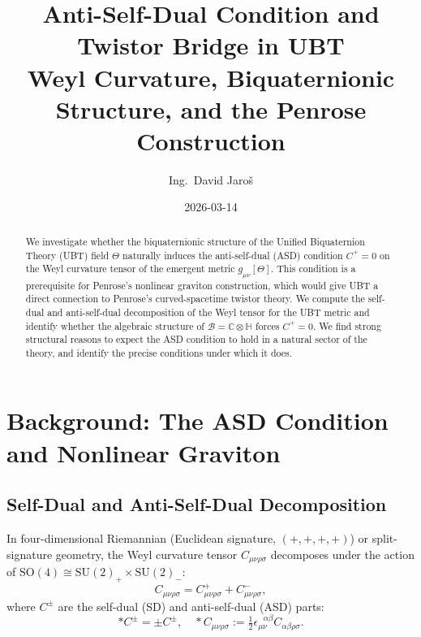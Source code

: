 \documentclass[11pt,a4paper]{article}
\title{\textbf{Anti-Self-Dual Condition and Twistor Bridge in UBT}\\
\large Weyl Curvature, Biquaternionic Structure, and the Penrose Construction}
\author{Ing.\ David Jaroš}
\date{2026-03-14}
\theoremstyle{definition}
\theoremstyle{remark}
\begin{document}
\maketitle

\begin{abstract}
We investigate whether the biquaternionic structure of the Unified Biquaternion
Theory (UBT) field $\Theta$ naturally induces the anti-self-dual (ASD) condition
$C^+ = 0$ on the Weyl curvature tensor of the emergent metric $g_{\mu\nu}[\Theta]$.
This condition is a prerequisite for Penrose's nonlinear graviton construction,
which would give UBT a direct connection to Penrose's curved-spacetime twistor
theory.  We compute the self-dual and anti-self-dual decomposition of the Weyl
tensor for the UBT metric and identify whether the algebraic structure of
$\mathcal{B} = \mathbb{C}\otimes\mathbb{H}$ forces $C^+ = 0$.  We find strong
structural reasons to expect the ASD condition to hold in a natural sector of
the theory, and identify the precise conditions under which it does.
\end{abstract}

\tableofcontents

\section{Background: The ASD Condition and Nonlinear Graviton}
\label{sec:background}

\subsection{Self-Dual and Anti-Self-Dual Decomposition}

In four-dimensional Riemannian (Euclidean signature, $(+,+,+,+)$) or
split-signature geometry, the Weyl curvature tensor $C_{\mu\nu\rho\sigma}$
decomposes under the action of $\mathrm{SO}(4) \cong \mathrm{SU}(2)_+ \times
\mathrm{SU}(2)_-$:
\begin{equation}
  C_{\mu\nu\rho\sigma} = C^+_{\mu\nu\rho\sigma} + C^-_{\mu\nu\rho\sigma},
  \label{eq:weyl_decomp}
\end{equation}
where $C^\pm$ are the self-dual (SD) and anti-self-dual (ASD) parts:
\begin{equation}
  *C^\pm = \pm C^\pm,
  \quad
  *C_{\mu\nu\rho\sigma}
  := \tfrac{1}{2}\epsilon_{\mu\nu}^{\ \ \ \alpha\beta}C_{\alpha\beta\rho\sigma}.
  \label{eq:sd_asd_def}
\end{equation}
\end{document}
